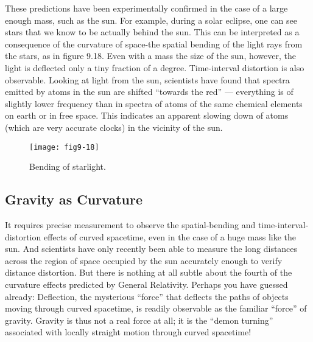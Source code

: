 \documentclass{book}
\begin{document}
These predictions have been experimentally confirmed in the case of a
large enough mass, such as the sun. For example, during a solar eclipse,
one can see stars that we know to be actually behind the sun. This can
be interpreted as a consequence of the curvature of space-the spatial
bending of the light rays from the stars, as in figure 9.18. Even with
a mass the size of the sun, however, the light is deflected only a tiny
fraction of a degree. Time-interval distortion is also observable. Looking
at light from the sun, scientists have found that spectra emitted by
atoms in the sun are shifted ``towards the red'' --- everything is of slightly
lower frequency than in spectra of atoms of the same chemical elements
on earth or in free space. This indicates an apparent slowing down of
atoms (which are very accurate clocks) in the vicinity of the sun.

\begin{figure}
\begin{center}
\texttt{[image: fig9-18]}
\caption{Bending of starlight.}
\end{center}
\end{figure}

\subsection{Gravity as Curvature}

It requires precise measurement to observe the spatial-bending and time-interval-distortion effects of curved spacetime, even in the case of a
huge mass like the sun. And scientists have only recently been able
to measure the long distances across the region of space occupied by
the sun accurately enough to verify distance distortion. But there is
nothing at all subtle about the fourth of the curvature effects predicted
by General Relativity. Perhaps you have guessed already: Deflection,
the mysterious ``force'' that deflects the paths of objects moving through
curved spacetime, is readily observable as the familiar ``force'' of gravity.
Gravity is thus not a real force at all; it is the ``demon turning'' associated
with locally straight motion through curved spacetime!
\end{document}

